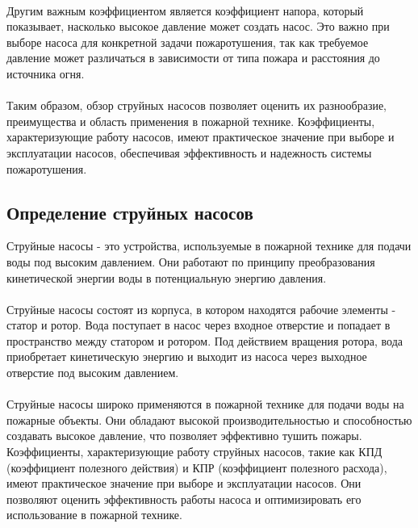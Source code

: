 \documentclass{article}
\begin{document}
~\\
Другим важным коэффициентом является коэффициент напора, который показывает, насколько высокое давление может создать насос. Это важно при выборе насоса для конкретной задачи пожаротушения, так как требуемое давление может различаться в зависимости от типа пожара и расстояния до источника огня.\\
~\\
Таким образом, обзор струйных насосов позволяет оценить их разнообразие, преимущества и область применения в пожарной технике. Коэффициенты, характеризующие работу насосов, имеют практическое значение при выборе и эксплуатации насосов, обеспечивая эффективность и надежность системы пожаротушения.
\subsection{Определение струйных насосов}
Струйные насосы - это устройства, используемые в пожарной технике для подачи воды под высоким давлением. Они работают по принципу преобразования кинетической энергии воды в потенциальную энергию давления.\\
~\\
Струйные насосы состоят из корпуса, в котором находятся рабочие элементы - статор и ротор. Вода поступает в насос через входное отверстие и попадает в пространство между статором и ротором. Под действием вращения ротора, вода приобретает кинетическую энергию и выходит из насоса через выходное отверстие под высоким давлением.\\
~\\
Струйные насосы широко применяются в пожарной технике для подачи воды на пожарные объекты. Они обладают высокой производительностью и способностью создавать высокое давление, что позволяет эффективно тушить пожары. Коэффициенты, характеризующие работу струйных насосов, такие как КПД (коэффициент полезного действия) и КПР (коэффициент полезного расхода), имеют практическое значение при выборе и эксплуатации насосов. Они позволяют оценить эффективность работы насоса и оптимизировать его использование в пожарной технике.
\end{document}
